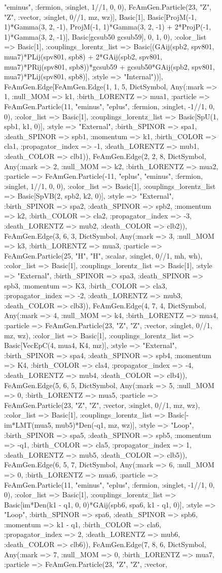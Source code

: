 \documentclass{revtex4}
\begin{document}
\begin{figure}[!htb]
\begin{center}
{"eminus", :fermion, :singlet, 1//1, 0, 0), FeAmGen.Particle(23, "Z", "Z", :vector, :singlet, 0//1, mz, wz)], Basic[1], Basic[ProjM(-1, 1)*Gamma(3, 2, -1), ProjM(-1, 1)*Gamma(3, 2, -1) + 2*ProjP(-1, 1)*Gamma(3, 2, -1)], Basic[gcsub50 gcsub59], 0, 1, 0), :color_list => Basic[1], :couplings_lorentz_list => Basic[(GAij(spb2, spv801, mua7)*PLij(spv801, spb8) + 2*GAij(spb2, spv801, mua7)*PRij(spv801, spb8))*gcsub59 + gcsub50*GAij(spb2, spv801, mua7)*PLij(spv801, spb8)], :style => "Internal"))], FeAmGen.Edge[FeAmGen.Edge(1, 1, 5, Dict{Symbol, Any}(:mark => 1, :null_MOM => k1, :birth_LORENTZ => mua1, :particle => FeAmGen.Particle(11, "eminus", "eplus", :fermion, :singlet, -1//1, 0, 0), :color_list => Basic[1], :couplings_lorentz_list => Basic[SpU(1, spb1, k1, 0)], :style => "External", :birth_SPINOR => spa1, :death_SPINOR => spb1, :momentum => k1, :birth_COLOR => cla1, :propagator_index => -1, :death_LORENTZ => mub1, :death_COLOR => clb1)), FeAmGen.Edge(2, 2, 8, Dict{Symbol, Any}(:mark => 2, :null_MOM => k2, :birth_LORENTZ => mua2, :particle => FeAmGen.Particle(-11, "eplus", "eminus", :fermion, :singlet, 1//1, 0, 0), :color_list => Basic[1], :couplings_lorentz_list => Basic[SpVB(2, spb2, k2, 0)], :style => "External", :birth_SPINOR => spa2, :death_SPINOR => spb2, :momentum => k2, :birth_COLOR => cla2, :propagator_index => -3, :death_LORENTZ => mub2, :death_COLOR => clb2)), FeAmGen.Edge(3, 6, 3, Dict{Symbol, Any}(:mark => 3, :null_MOM => k3, :birth_LORENTZ => mua3, :particle => FeAmGen.Particle(25, "H", "H", :scalar, :singlet, 0//1, mh, wh), :color_list => Basic[1], :couplings_lorentz_list => Basic[1], :style => "External", :birth_SPINOR => spa3, :death_SPINOR => spb3, :momentum => K3, :birth_COLOR => cla3, :propagator_index => -2, :death_LORENTZ => mub3, :death_COLOR => clb3)), FeAmGen.Edge(4, 7, 4, Dict{Symbol, Any}(:mark => 4, :null_MOM => k4, :birth_LORENTZ => mua4, :particle => FeAmGen.Particle(23, "Z", "Z", :vector, :singlet, 0//1, mz, wz), :color_list => Basic[1], :couplings_lorentz_list => Basic[VecEpC(4, mua4, K4, mz)], :style => "External", :birth_SPINOR => spa4, :death_SPINOR => spb4, :momentum => K4, :birth_COLOR => cla4, :propagator_index => -4, :death_LORENTZ => mub4, :death_COLOR => clb4)), FeAmGen.Edge(5, 6, 5, Dict{Symbol, Any}(:mark => 5, :null_MOM => 0, :birth_LORENTZ => mua5, :particle => FeAmGen.Particle(23, "Z", "Z", :vector, :singlet, 0//1, mz, wz), :color_list => Basic[1], :couplings_lorentz_list => Basic[-im*LMT(mua5, mub5)*Den(-q1, mz, wz)], :style => "Loop", :birth_SPINOR => spa5, :death_SPINOR => spb5, :momentum => -q1, :birth_COLOR => cla5, :propagator_index => 1, :death_LORENTZ => mub5, :death_COLOR => clb5)), FeAmGen.Edge(6, 5, 7, Dict{Symbol, Any}(:mark => 6, :null_MOM => 0, :birth_LORENTZ => mua6, :particle => FeAmGen.Particle(11, "eminus", "eplus", :fermion, :singlet, -1//1, 0, 0), :color_list => Basic[1], :couplings_lorentz_list => Basic[im*Den(k1 - q1, 0, 0)*GAij(spb6, spa6, k1 - q1, 0)], :style => "Loop", :birth_SPINOR => spa6, :death_SPINOR => spb6, :momentum => k1 - q1, :birth_COLOR => cla6, :propagator_index => 2, :death_LORENTZ => mub6, :death_COLOR => clb6)), FeAmGen.Edge(7, 8, 6, Dict{Symbol, Any}(:mark => 7, :null_MOM => 0, :birth_LORENTZ => mua7, :particle => FeAmGen.Particle(23, "Z", "Z", :vector, }
\end{center}
\end{figure}
\end{document}
